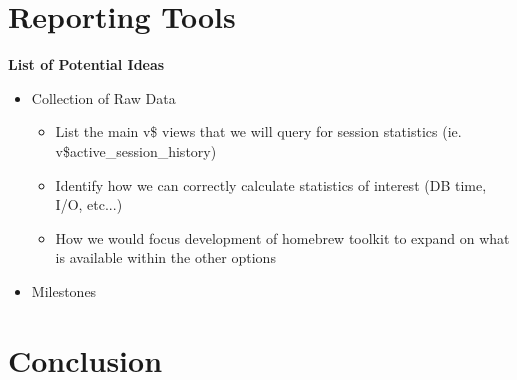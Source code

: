 \documentclass[draftclsnofoot, onecolumn, compsoc, 10pt]{IEEEtran}
\begin{document}
\section{Reporting Tools}
\textbf{List of Potential Ideas}
\begin{itemize} 
	\item Collection of Raw Data
    \begin{itemize}
    	\item List the main v\$ views that we will query for session statistics (ie. v\$active\_session\_history)
        \item Identify how we can correctly calculate statistics of interest (DB time, I/O, etc...)
        \item How we would focus development of homebrew toolkit to expand on what is available within the other options
    \end{itemize}
    \item Milestones
\end{itemize}

\section{Conclusion}
\end{document}
